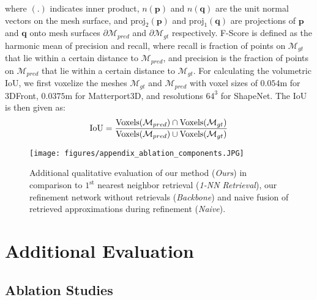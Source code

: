 where $(.)$ indicates inner product, $n(\mathbf{p})$ and $n(\mathbf{q})$ are the unit normal vectors on the mesh surface, and $\mathrm{proj}_2(\mathbf{p})$ and $\mathrm{proj}_1(\mathbf{q})$ are projections of $\mathbf{p}$ and $\mathbf{q}$ onto mesh surfaces $\partial\mathcal{M}_{pred}$ and $\partial\mathcal{M}_{gt}$ respectively.
%
F-Score \cite{tatarchenko2019single} is defined as the harmonic mean of precision and recall, where recall is fraction of points on $\mathcal{M}_{gt}$ that lie within a certain distance to $\mathcal{M}_{pred}$, and precision is the fraction of points on $\mathcal{M}_{pred}$ that lie within a certain distance to $\mathcal{M}_{gt}$.
%
For calculating the volumetric IoU, we first voxelize the meshes $\mathcal{M}_{gt}$ and $\mathcal{M}_{pred}$ with voxel sizes of $0.054$m for 3DFront, $0.0375$m for Matterport3D, and resolutions $64^3$ for ShapeNet.
%
The IoU is then given as:
\begin{equation*}
    \small
    \mathrm{IoU} = \frac{\mathrm{Voxels}(\mathcal{M}_{pred}) \cap \mathrm{Voxels}(\mathcal{M}_{gt})}{\mathrm{Voxels}(\mathcal{M}_{pred}) \cup \mathrm{Voxels}(\mathcal{M}_{gt})}
\end{equation*}

\begin{figure*}
	\centering
	\texttt{[image: figures/appendix\_ablation\_components.JPG]}
	\caption{Additional qualitative evaluation of our method (\textit{Ours}) in comparison to $1^\mathrm{st}$ nearest neighbor retrieval (\textit{1-NN Retrieval}), our refinement network without retrievals (\textit{Backbone}) and naive fusion of retrieved approximations during refinement (\textit{Naive}).}
	\label{fig:appendix_components}
\end{figure*}


\section{Additional Evaluation}
\label{sec:appendix_evaluation}

\subsection{Ablation Studies}

